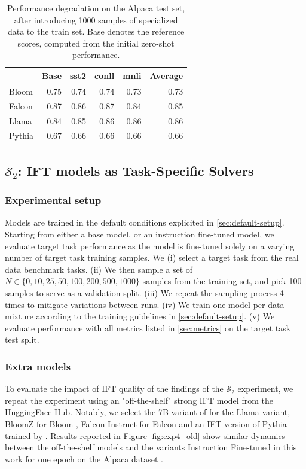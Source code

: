 \begin{table}
    \centering
    \begin{tabular}{lrrrrr}
    \toprule
     & Base & sst2 & conll & mnli & Average \\
    \midrule
    Bloom & 0.75 & 0.74 & 0.74 & 0.73 & 0.73 \\
    Falcon & 0.87 & 0.86 & 0.87 & 0.84 & 0.85 \\
    Llama & 0.84 & 0.85 & 0.86 & 0.86 & 0.86 \\
    Pythia & 0.67 & 0.66 & 0.66 & 0.66 & 0.66 \\
    \bottomrule
    \end{tabular}
    
    \caption[Alpaca test degradation]{Performance degradation on the Alpaca test set, after introducing 1000 samples of specialized data to the train set. Base denotes the reference scores, computed from the initial zero-shot performance.}
    \label{tab:perf_deg}
\end{table}



\subsection{$\mathcal{S}_2$: IFT models as Task-Specific Solvers}

\subsubsection{Experimental setup}
Models are trained in the default conditions explicited in \ref{sec:default-setup}. Starting from either a base model, or an instruction fine-tuned model, we evaluate target task performance as the model is fine-tuned solely on a varying number of target task training samples. We (i) select a target task from the real data benchmark tasks. (ii) We then sample a set of $N \in \{0, 10, 25, 50, 100, 200, 500, 1000\}$ samples from the training set, and pick 100 samples to serve as a validation split. (iii) We repeat the sampling process 4 times to mitigate variations between runs. (iv) We train one model per data mixture according to the training guidelines in \ref{sec:default-setup}. (v) We evaluate performance with all metrics listed in \ref{sec:metrics} on the target task test split.


\subsubsection{Extra models}
\label{sec:extra-datasets-exp4}
To evaluate the impact of IFT quality of the findings of the $\mathcal{S}_2$ experiment, we repeat the experiment using an "off-the-shelf" strong IFT model from the HuggingFace Hub. Notably, we select the 7B variant of  for the Llama variant, BloomZ for Bloom , Falcon-Instruct for Falcon  and an IFT version of Pythia trained by . Results reported in Figure \ref{fig:exp4_old} show similar dynamics between the off-the-shelf models and the variants Instruction Fine-tuned in this work for one epoch on the Alpaca dataset .

